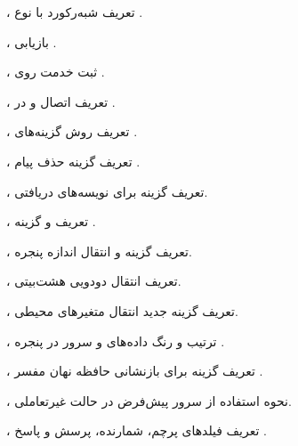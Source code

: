 \href{https://www.rfc-editor.org/rfc/rfc6891.html}{}، تعریف شبه‌رکورد  با نوع .

\href{https://www.wireshark.org/docs/wsug_html_chunked/ChIOExportSection.html}{}، بازیابی .

\href{https://www.iana.org/assignments/service-names-port-numbers/service-names-port-numbers.xhtml?search=23}{}، ثبت خدمت  روی .

\href{https://www.rfc-editor.org/rfc/rfc854.html}{}، تعریف اتصال و  در .

\href{https://www.rfc-editor.org/rfc/rfc855.html}{}، تعریف روش  گزینه‌های .

\href{https://www.rfc-editor.org/rfc/rfc858.html}{}، تعریف گزینه حذف پیام .

\href{https://www.rfc-editor.org/rfc/rfc857.html}{}، تعریف گزینه  برای نویسه‌های دریافتی.

\href{https://www.rfc-editor.org/rfc/rfc1091.html}{}، تعریف  و  گزینه .

\href{https://www.rfc-editor.org/rfc/rfc1073.html}{}، تعریف گزینه  و انتقال اندازه پنجره.

\href{https://www.rfc-editor.org/rfc/rfc856.html}{}، تعریف انتقال دودویی هشت‌بیتی.

\href{https://www.rfc-editor.org/rfc/rfc1572.html}{}، تعریف گزینه جدید انتقال متغیرهای محیطی.

\href{https://www.wireshark.org/docs/wsug_html_chunked/ChAdvFollowStreamSection.html}{}، ترتیب و رنگ داده‌های  و سرور در پنجره .

\href{https://learn.microsoft.com/en-us/windows-server/administration/windows-commands/ipconfig}{}، تعریف گزینه  برای بازنشانی حافظه نهان مفسر .

\href{https://learn.microsoft.com/en-us/windows-server/administration/windows-commands/nslookup}{}، نحوه استفاده از سرور پیش‌فرض در حالت غیرتعاملی.

\href{https://www.wireshark.org/docs/dfref/d/dns.html}{}، تعریف فیلدهای پرچم، شمارنده، پرسش و پاسخ .

